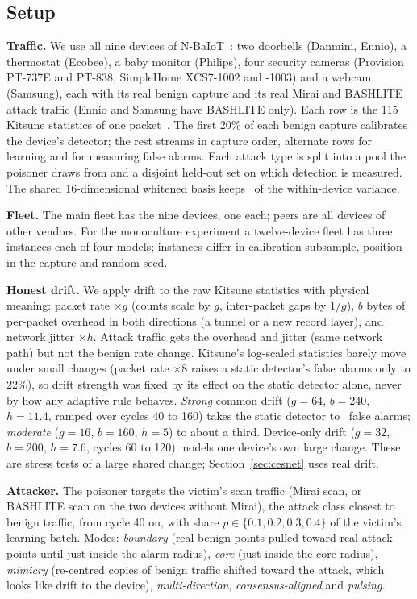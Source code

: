 \subsection{Setup}\label{sec:setup}

\textbf{Traffic.} We use all nine devices of N-BaIoT~\cite{nbaiot}: two doorbells (Danmini, Ennio), a
thermostat (Ecobee), a baby monitor (Philips), four security cameras (Provision PT-737E and PT-838,
SimpleHome XCS7-1002 and -1003) and a webcam (Samsung), each with its real benign capture and its real
Mirai and BASHLITE attack traffic (Ennio and Samsung have BASHLITE only). Each row is the 115 Kitsune
statistics of one packet~\cite{kitsune}. The first 20\% of each benign capture calibrates the device's
detector; the rest streams in capture order, alternate rows for learning and for measuring false alarms.
Each attack type is split into a pool the poisoner draws from and a disjoint held-out set on which
detection is measured. The shared 16-dimensional whitened basis keeps \ExplainedVar\ of the within-device variance.

\textbf{Fleet.} The main fleet has the nine devices, one each; peers are all devices of other vendors.
For the monoculture experiment a twelve-device fleet has three instances each of four models; instances
differ in calibration subsample, position in the capture and random seed.

\textbf{Honest drift.} We apply drift to the raw Kitsune statistics with physical meaning: packet rate
$\times g$ (counts scale by $g$, inter-packet gaps by $1/g$), $b$ bytes of per-packet overhead in both
directions (a tunnel or a new record layer), and network jitter $\times h$. Attack traffic gets the
overhead and jitter (same network path) but not the benign rate change. Kitsune's log-scaled
statistics barely move under small changes (packet rate $\times 8$ raises a static detector's false
alarms only to 22\%), so drift strength was fixed by its effect on the static detector alone, never by
how any adaptive rule behaves. \emph{Strong} common drift ($g=64$, $b=240$, $h=11.4$, ramped over cycles 40
to 160) takes the static detector to \StrongStaticFPR\ false alarms; \emph{moderate} ($g=16$, $b=160$,
$h=5$) to about a third. Device-only drift ($g=32$, $b=200$, $h=7.6$, cycles 60 to 120) models one
device's own large change. These are stress tests of a large shared change; Section~\ref{sec:cesnet}
uses real drift.

\textbf{Attacker.} The poisoner targets the victim's scan traffic (Mirai scan, or BASHLITE scan on the
two devices without Mirai), the attack class closest to benign traffic, from cycle 40 on, with share
$p\in\{0.1,0.2,0.3,0.4\}$ of the victim's learning batch. Modes: \emph{boundary} (real benign points
pulled toward real attack points until just inside the alarm radius), \emph{core} (just inside the core
radius), \emph{mimicry} (re-centred copies of benign traffic shifted toward the attack, which looks like
drift to the device), \emph{multi-direction}, \emph{consensus-aligned} and \emph{pulsing}.

